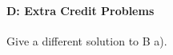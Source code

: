 \documentclass[12pt]{article}
\begin{document}
\paragraph{D: Extra Credit Problems}
\begin{itemize}
{\item Give a different solution to B a).}
\end{itemize}
\end{document}
